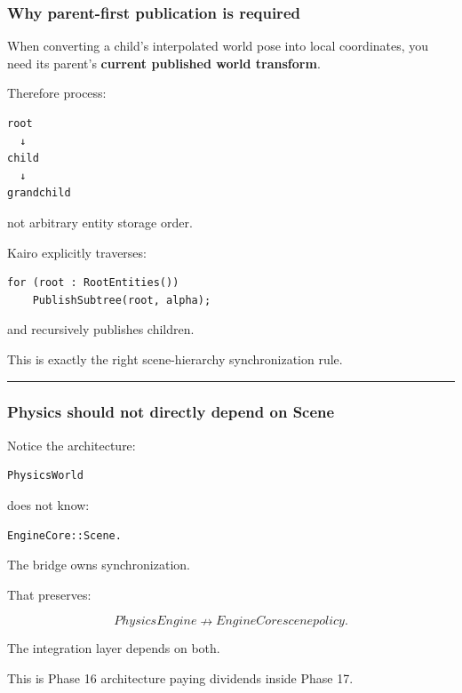 \subsubsection{Why parent-first publication is required}\label{why-parent-first-publication-is-required}

When converting a child's interpolated world pose into local coordinates, you need its parent's \textbf{current published world transform}.

Therefore process:

\begin{verbatim}
root
  ↓
child
  ↓
grandchild
\end{verbatim}

not arbitrary entity storage order.

Kairo explicitly traverses:

\begin{verbatim}
for (root : RootEntities())
    PublishSubtree(root, alpha);
\end{verbatim}

and recursively publishes children.

This is exactly the right scene-hierarchy synchronization rule.

\begin{center}\rule{0.5\linewidth}{0.5pt}\end{center}

\subsubsection{Physics should not directly depend on Scene}\label{physics-should-not-directly-depend-on-scene}

Notice the architecture:

\begin{verbatim}
PhysicsWorld
\end{verbatim}

does not know:

\begin{verbatim}
EngineCore::Scene.
\end{verbatim}

The bridge owns synchronization.

That preserves:

\[
PhysicsEngine
\nrightarrow
EngineCore scene policy.
\]

The integration layer depends on both.

This is Phase 16 architecture paying dividends inside Phase 17.

